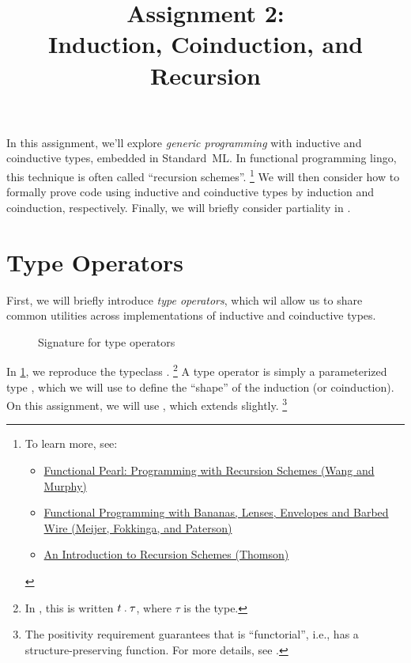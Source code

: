 \documentclass[11pt]{article}
\title{Assignment 2: \\
       Induction, Coinduction, and Recursion}
\begin{document}
\maketitle

In this assignment, we'll explore \emph{generic programming} with inductive and coinductive types, embedded in Standard~ML.
In functional programming lingo, this technique is often called ``recursion schemes''.%
\footnote{
  To learn more, see:
  \begin{itemize}
    \item \href{https://www.cs.cmu.edu/~tom7/papers/wang-murphy-recursion.pdf}{Functional Pearl: Programming with Recursion Schemes (Wang and Murphy)}
    \item \href{https://maartenfokkinga.github.io/utwente/mmf91m.pdf}{Functional Programming with Bananas, Lenses, Envelopes and Barbed Wire (Meijer, Fokkinga, and Paterson)}
    \item \href{https://blog.sumtypeofway.com/posts/introduction-to-recursion-schemes.html}{An Introduction to Recursion Schemes (Thomson)}
  \end{itemize}
  }
We will then consider how to formally prove code using inductive and coinductive types by induction and coinduction, respectively.
Finally, we will briefly consider partiality in \LangPCF{}.


\section{Type Operators}

First, we will briefly introduce \emph{type operators}, which wil allow us to share common utilities across implementations of inductive and coinductive types.

\begin{figure}[h]
  \caption{Signature for type operators}
  \label{fig:type-operator}
\end{figure}

In \cref{fig:type-operator}, we reproduce the typeclass .%
\footnote{In \PFPL, this is written ${t}\mathbin{\mathtt{.}}{\tau}$, where $\tau$ is the  type.}
A type operator is simply a parameterized type , which we will use to define the ``shape'' of the induction (or coinduction).
On this assignment, we will use , which extends  slightly.%
\footnote{The positivity requirement guarantees that  is ``functorial'', i.e., has a structure-preserving  function. For more details, see \PFPL[14].}
\end{document}
